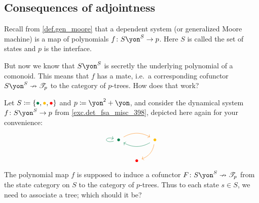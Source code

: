 \documentclass[Book-Poly]{subfiles}
\begin{document}
\subsection{Consequences of adjointness}


Recall from \cref{def.gen_moore} that a dependent system (or generalized Moore machine) is a map of polynomials $f\colon S\yon^S\to p$. Here $S$ is called the set of states and $p$ is the interface. 

But now we know that $S\yon^S$ is secretly the underlying polynomial of a comonoid. This means that $f$ has a mate, i.e.\ a corresponding cofunctor $S\yon^S\cof\cofree{p}$ to the category of $p$-trees. How does that work?

\begin{example}\label{ex.cofree_dyn_sys}
Let $S\coloneqq\{\bul[dgreen],\bul[dyellow],\bul[red]\}$ and $p\coloneqq\yon^\2+\yon$, and consider the dynamical system $f\colon S\yon^S\to p$ from \cref{exc.det_fsa_misc_398}, depicted here again for your convenience:
\[
\begin{tikzcd}[column sep=small]
	\bul[dgreen]\ar[rr, bend left, orange]\ar[loop left, dgreen]&&
	\bul[dyellow]\ar[dl, bend left, orange]\ar[ll, dgreen, bend left]\\&
	\bul[red]
\end{tikzcd}
\]
The polynomial map $f$ is supposed to induce a cofunctor $F\colon S\yon^S\cof\cofree{p}$ from the state category on $S$ to the category of $p$-trees. Thus to each state $s\in S$, we need to associate a tree; which should it be? 
\end{example}
\end{document}
